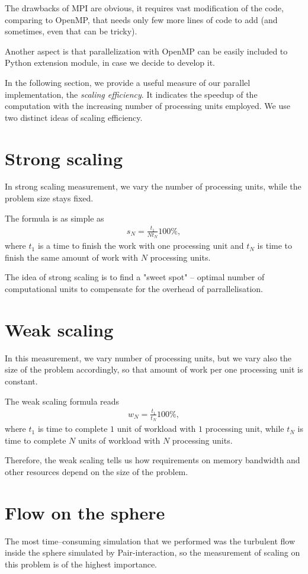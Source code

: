 The drawbacks of MPI are obvious, it requires vast modification of the code, comparing to OpenMP, that needs only few more lines of code to add (and sometimes, even that can be tricky).

Another aspect is that parallelization with OpenMP can be easily included to Python extension module, in case we decide to develop it.

In the following section, we provide a useful measure of our parallel implementation, the \textit{scaling efficiency}. It indicates the speedup of the computation with the increasing number of processing units employed.
We use two distinct ideas of scaling efficiency.

\section{Strong scaling}
In strong scaling measurement, we vary the number of processing units, while the problem size stays fixed.

The formula is as simple as
\begin{align*}
s_N = \frac{t_1}{N t_N} 100\%,
\end{align*}
where $t_1$ is a time to finish the work with one processing unit and $t_N$ is time to finish the same amount of work with $N$ processing units.

The idea of strong scaling is to find a "sweet spot" -- optimal number of computational units to compensate for the overhead of parrallelisation.
\section{Weak scaling}
In this measurement, we vary number of processing units, but we vary also the size of the problem accordingly, so that amount of work per one processing unit is constant.

The weak scaling formula reads
\begin{align*}
w_N = \frac{t_1}{t_N} 100\%,
\end{align*}
where $t_1$ is time to complete $1$ unit of workload with $1$ processing unit, while $t_N$ is time to complete $N$ units of workload with $N$ processing units.

Therefore, the weak scaling tells us how requirements on memory bandwidth and other resources depend on the size of the problem.

\section{Flow on the sphere}
The most time--consuming simulation that we performed was the turbulent flow inside the sphere simulated by Pair-interaction, so the measurement of scaling on this problem is of the highest importance.

